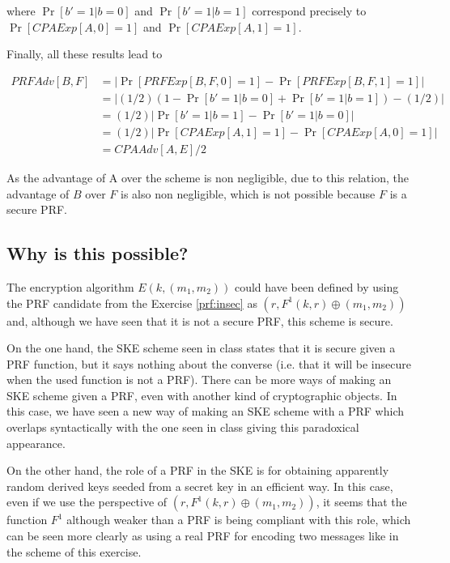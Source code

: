 \documentclass{article}
\newcommand{\xor}{\oplus}
\begin{document}
where $\Pr[b' = 1 | b = 0]$ and $\Pr[ b' = 1 | b = 1]$ correspond 
precisely to $\Pr[CPAExp[A,0] = 1]$ and $\Pr[CPAExp[A,1] = 1]$.

Finally, all these results lead to

\begin{align*}
PRFAdv[B, F] &= \Big| \Pr[PRFExp[B,F,0]=1] - \Pr[PRFExp[B,F,1]=1]\Big| \\
  &= \Big| (1/2)(1 - \Pr[b' = 1 | b = 0] + \Pr[ b' = 1 | b = 1]) - (1/2)\Big| \\
  &= (1/2)\Big| \Pr[ b' = 1 | b = 1] - \Pr[b' = 1 | b = 0] \Big| \\
  &= (1/2)\Big| \Pr[CPAExp[A,1] = 1] - \Pr[CPAExp[A,0] = 1] \Big| \\
  &= CPAAdv[A,E]/2
\end{align*}

As the advantage of A over the scheme is non negligible, due to this 
relation, the advantage of $B$ over $F$ is also non negligible, which 
is not possible because $F$ is a secure PRF.

\subsection{Why is this possible?}

The encryption algorithm $E(k, (m_1, m_2))$ could have been defined 
by using the PRF candidate from the Exercise \ref{prf:insec} as
$(r, F^1(k,r) \xor (m_1,m_2))$ and, although we have seen that it 
is not a secure PRF, this scheme is secure.

On the one hand, the SKE scheme seen in class states that it is 
secure given a PRF function, but it says nothing 
about the converse (i.e. that it will be
insecure when the used function is not a PRF). There can be more
ways of making an SKE scheme given a PRF, even with another 
kind of cryptographic objects. In this case, we have seen a new way 
of making an SKE scheme with a PRF which overlaps syntactically 
with the one seen in class giving this paradoxical appearance.

On the other hand, the role of a PRF in the SKE is for obtaining
apparently random derived keys seeded from a secret key in an 
efficient way. In this case, even if we use the perspective of 
$(r, F^1(k,r) \xor (m_1,m_2))$, it seems that the function $F^1$
although weaker than a PRF is 
being compliant with this role, which can be seen more clearly as using 
a real PRF for encoding two messages like in the scheme of this exercise.
\end{document}
